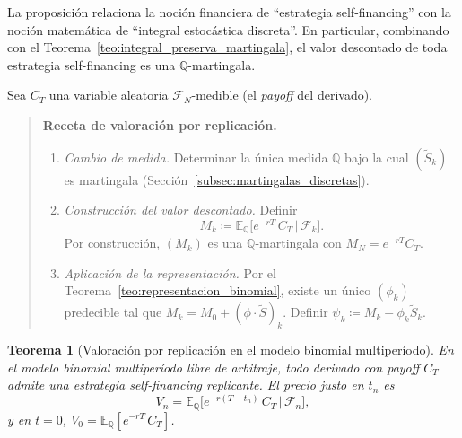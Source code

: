 \documentclass[11pt,a4paper,oneside]{report}
\theoremstyle{plain}
\newtheorem{teorema}{Teorema}[chapter]
\theoremstyle{definition}
\theoremstyle{remark}
\newcommand{\E}{\mathbb{E}}
\newcommand{\Q}{\mathbb{Q}}
\newcommand{\F}{\mathcal{F}}
\newcommand{\1}{\mathbf{1}}
\newcommand{\eqdef}{\coloneqq}
\begin{document}
La proposición relaciona la noción
financiera de ``estrategia self-financing'' con la noción matemática de
``integral estocástica discreta''. En particular, combinando con el
Teorema~\ref{teo:integral_preserva_martingala}, el valor descontado de
toda estrategia self-financing es una $\Q$-martingala.

Sea $C_T$ una variable
aleatoria $\F_N$-medible (el \emph{payoff} del derivado).

\begin{quote}
\textbf{Receta de valoración por replicación.}
\begin{enumerate}[label=\textbf{Paso \arabic*.}, leftmargin=*]
  \item \emph{Cambio de medida.} Determinar la única medida $\Q$ bajo
        la cual $(\widetilde S_k)$ es martingala
        (Sección~\ref{subsec:martingalas_discretas}).
  \item \emph{Construcción del valor descontado.} Definir
        \begin{equation}\label{eq:def_M_replicante_discreto}
          M_k \eqdef \E_\Q\bigl[e^{-rT}\, C_T \,\big|\, \F_k\bigr].
        \end{equation}
        Por construcción, $(M_k)$ es una $\Q$-martingala con $M_N =
        e^{-rT} C_T$.
  \item \emph{Aplicación de la representación.} Por el
        Teorema~\ref{teo:representacion_binomial}, existe un único
        $(\phi_k)$ predecible tal que $M_k = M_0 + (\phi \cdot
        \widetilde S)_k$. Definir $\psi_k \eqdef M_k - \phi_k
        \widetilde S_k$.
\end{enumerate}
\end{quote}

\begin{teorema}[Valoración por replicación en el modelo binomial multiperíodo]
\label{teo:valoracion_binomial}
En el modelo binomial multiperíodo libre de arbitraje, todo derivado
con \emph{payoff} $C_T$ admite una estrategia self-financing
replicante. El precio justo en $t_n$ es
\begin{equation}\label{eq:precio_binomial_multi}
  V_n = \E_\Q\bigl[e^{-r(T - t_n)}\, C_T \,\big|\, \F_n\bigr],
\end{equation}
y en $t = 0$, $V_0 = \E_\Q[e^{-rT}\, C_T]$.
\end{teorema}
\end{document}

